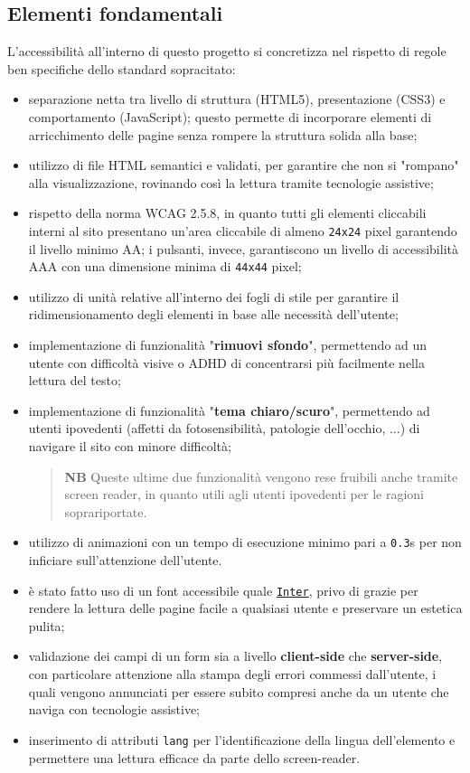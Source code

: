 \documentclass[a4paper,10pt]{article}
\begin{document}
	\subsection{Elementi fondamentali}
	L'accessibilità all'interno di questo progetto si concretizza nel rispetto di regole ben specifiche dello standard sopracitato:
	\begin{itemize}
		\item separazione netta tra livello di struttura (HTML5), presentazione (CSS3) e comportamento (JavaScript); questo permette di incorporare elementi di arricchimento delle pagine senza rompere la struttura solida alla base;
		\item utilizzo di file HTML semantici e validati, per garantire che non si "rompano" alla visualizzazione, rovinando così la lettura tramite tecnologie assistive;
		\item rispetto della norma WCAG 2.5.8, in quanto tutti gli elementi cliccabili interni al sito presentano un'area cliccabile di almeno \texttt{24x24} pixel garantendo il livello minimo AA; i pulsanti, invece, garantiscono un livello di accessibilità AAA con una dimensione minima di \texttt{44x44} pixel;
		\item utilizzo di unità relative all'interno dei fogli di stile per garantire il ridimensionamento degli elementi in base alle necessità dell'utente;
		\item implementazione di funzionalità "\textbf{rimuovi sfondo}", permettendo ad un utente con difficoltà visive o ADHD di concentrarsi più facilmente nella lettura del testo;
		\item implementazione di funzionalità "\textbf{tema chiaro/scuro}", permettendo ad utenti ipovedenti (affetti da fotosensibilità, patologie dell'occhio, ...) di navigare il sito con minore difficoltà;
		\begin{quote}
			\textbf{NB} Queste ultime due funzionalità vengono rese fruibili anche tramite screen reader, in quanto utili agli utenti ipovedenti per le ragioni soprariportate.
		\end{quote}
		\item utilizzo di animazioni con un tempo di esecuzione minimo pari a \texttt{0.3}s per non inficiare sull'attenzione dell'utente.
		\item è stato fatto uso di un font accessibile quale \href{https://fonts.google.com/specimen/Inter?query=inter}{\texttt{Inter}}, privo di grazie per rendere la lettura delle pagine facile a qualsiasi utente e preservare un estetica pulita;
		\item validazione dei campi di un form sia a livello \textbf{client-side} che \textbf{server-side}, con particolare attenzione alla stampa degli errori commessi dall'utente, i quali vengono annunciati per essere subito compresi anche da un utente che naviga con tecnologie assistive;
		\item inserimento di attributi \texttt{lang} per l'identificazione della lingua dell'elemento e permettere una lettura efficace da parte dello screen-reader.
	\end{itemize}
\end{document}
